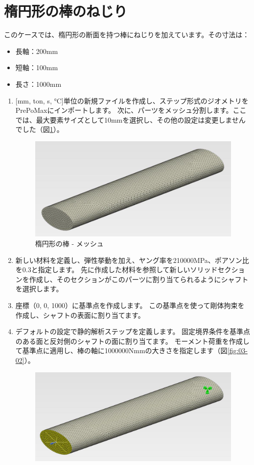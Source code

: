 \section{楕円形の棒のねじり}
このケースでは、楕円形の断面を持つ棒にねじりを加えています。その寸法は：
\begin{itemize}
\item 長軸：200mm
\item 短軸：100mm
\item 長さ：1000mm
\end{itemize}
\begin{enumerate}
\item
  {[}mm, ton, s, °C{]}単位の新規ファイルを作成し、ステップ形式のジオメトリをPrePoMaxにインポートします。
  次に、パーツをメッシュ分割します。ここでは、最大要素サイズとして10mmを選択し、その他の設定は変更しませんでした（図\ref{fig:03-01}）。
	\begin{figure}[H]
	\centering
	\includegraphics[width=127mm]{fig/03-01.png}
	\caption{楕円形の棒 - メッシュ}
	\label{fig:03-01}
	\end{figure}
\item
  新しい材料を定義し、弾性挙動を加え、ヤング率を210000MPa、ポアソン比を0.3と指定します。
  先に作成した材料を参照して新しいソリッドセクションを作成し、そのセクションがこのパーツに割り当てられるようにシャフトを選択します。
\item
  座標（0, 0, 1000）に基準点を作成します。
  この基準点を使って剛体拘束を作成し、シャフトの表面に割り当てます。
\item
  デフォルトの設定で静的解析ステップを定義します。
  固定境界条件を基準点のある面と反対側のシャフトの面に割り当てます。
  モーメント荷重を作成して基準点に適用し、棒の軸に1000000Nmmの大きさを指定します（図\ref{fig:03-02}）。
	\begin{figure}[H]
	\centering
	\includegraphics[width=142mm]{fig/03-02.png}

\end{figure}
\end{enumerate}
